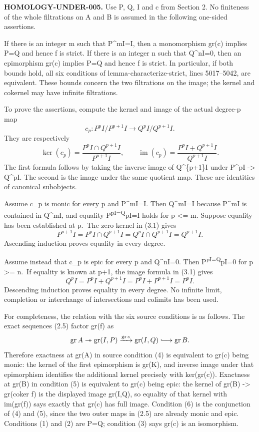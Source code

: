 \documentclass[11pt]{article}
\begin{document}
\textbf{HOMOLOGY-UNDER-005.} Use P, Q, I and c from Section 2. No finiteness of the whole filtrations on A and B is assumed in the following one-sided assertions.

If there is an integer m such that P\^{}mI=I, then a monomorphism gr(c) implies P=Q and hence f is strict. If there is an integer n such that Q\^{}nI=0, then an epimorphism gr(c) implies P=Q and hence f is strict. In particular, if both bounds hold, all six conditions of lemma-characterize-strict, lines 5017--5042, are equivalent. These bounds concern the two filtrations on the image; the kernel and cokernel may have infinite filtrations.

To prove the assertions, compute the kernel and image of the actual degree-p map \[
c_p:P^pI/P^{p+1}I\longrightarrow Q^pI/Q^{p+1}I.
\] They are respectively \[
\ker(c_p)=
\frac{P^pI\cap Q^{p+1}I}{P^{p+1}I},\qquad
\operatorname{im}(c_p)=
\frac{P^pI+Q^{p+1}I}{Q^{p+1}I}.                           \tag{3.1}
\] The first formula follows by taking the inverse image of Q\^{}\{p+1\}I under P\^{}pI -\textgreater{} Q\^{}pI. The second is the image under the same quotient map. These are identities of canonical subobjects.

Assume c\_p is monic for every p and P\^{}mI=I. Then Q\^{}mI=I because P\^{}mI is contained in Q\^{}mI, and equality P\textsuperscript{pI=Q}pI=I holds for p \textless= m. Suppose equality has been established at p.~The zero kernel in (3.1) gives \[
P^{p+1}I=P^pI\cap Q^{p+1}I
=Q^pI\cap Q^{p+1}I=Q^{p+1}I.
\] Ascending induction proves equality in every degree.

Assume instead that c\_p is epic for every p and Q\^{}nI=0. Then P\textsuperscript{pI=Q}pI=0 for p \textgreater= n.~If equality is known at p+1, the image formula in (3.1) gives \[
Q^pI=P^pI+Q^{p+1}I=P^pI+P^{p+1}I=P^pI.
\] Descending induction proves equality in every degree. No infinite limit, completion or interchange of intersections and colimits has been used.

For completeness, the relation with the six source conditions is as follows. The exact sequences (2.5) factor gr(f) as \[
\operatorname{gr}A
\twoheadrightarrow\operatorname{gr}(I,P)
\xrightarrow{\operatorname{gr}c}\operatorname{gr}(I,Q)
\lhook\joinrel\longrightarrow\operatorname{gr}B.
\] Therefore exactness at gr(A) in source condition (4) is equivalent to gr(c) being monic: the kernel of the first epimorphism is gr(K), and inverse image under that epimorphism identifies the additional kernel precisely with ker(gr(c)). Exactness at gr(B) in condition (5) is equivalent to gr(c) being epic: the kernel of gr(B) -\textgreater{} gr(coker f) is the displayed image gr(I,Q), so equality of that kernel with im(gr(f)) says exactly that gr(c) has full image. Condition (6) is the conjunction of (4) and (5), since the two outer maps in (2.5) are already monic and epic. Conditions (1) and (2) are P=Q; condition (3) says gr(c) is an isomorphism.
\end{document}
